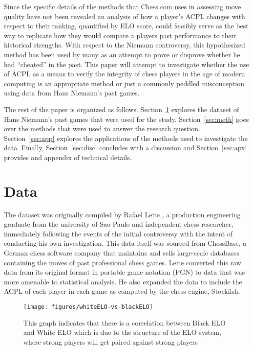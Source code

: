 \documentclass[12pt, letterpaper, titlepage]{article}
\begin{document}
Since the specific details of the methods that Chess.com uses in assessing move quality have not 
been revealed an analysis of how a player's ACPL changes with respect to their ranking, quantified 
by ELO score, could feasibly serve as the best way to replicate how they would compare a players 
past performance to their historical strengths. With respect to the Niemann controversy, this hypothesized
 method has been used by many \citet{medium2022} as an attempt to prove or disprove whether he had “cheated” 
 in the past. This paper will attempt to investigate whether the use of ACPL as a means to verify the 
 integrity of chess players in the age of modern computing is an appropriate method or just a commonly 
 peddled misconception using data from Hans Niemann's past games.

The rest of the paper is organized as follows. Section~\ref{sec:data} explores the dataset of Hans
 Niemann's past games that were used for the study. Section~\ref{sec:meth} goes over the methods that 
 were used to answer the research question. Section~\ref{sec:app} explores the applications of the methods 
 used to investigate the data. Finally, Section~\ref{sec:disc} concludes with a discussion and
  Section~\ref{sec:apx} provides and appendix of technical details.

\section{Data}
\label{sec:data}

The dataset was originally compiled by Rafael Leite \citep{leite2022}, a production engineering graduate from 
the university of Sao Paulo and independent chess researcher, immediately following the events of the initial 
controversy with the intent of conducting his own investigation. This data \citep{chessbase} itself was
 sourced from ChessBase, a German chess software company that maintains and sells large-scale databases 
 containing the moves of past professional chess games. Leite converted this raw data from its original
  format in portable game notation (PGN) to data that was more amenable to statistical analysis. He also
   expanded the data to include the ACPL of each player in each game as computed by the chess engine, Stockfish.

\begin{figure}[!htb]
    \centering
    \texttt{[image: figures/whiteELO-vs-blackELO]}
    \caption{This graph indicates that there is a correlation between Black ELO and White ELO which is due to 
    the structure of the ELO system, where strong players will get paired against strong players}
    \label{fig:elo_lineplot}
\end{figure}
\end{document}
